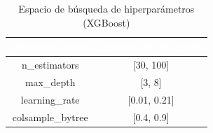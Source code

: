 \begin{table}[htp]
	\centering
	\renewcommand{\arraystretch}{1.3}
		\begin{tabular}{ | c | c | }
			\hline
			\rowcolor[HTML]{5B9BD5} 
			\textcolor{white}{\textbf{Hiperparámetro}} & \textcolor{white}{\textbf{Espacio de búsqueda}}\\
			\hline
			
			n\_estimators & [30, 100] \\
			\hline
			max\_depth & [3, 8] \\
			\hline
			learning\_rate & [0.01, 0.21] \\
			\hline
			colsample\_bytree & [0.4, 0.9] \\
			\hline
			
		\end{tabular} 
		
		\caption{Espacio de búsqueda de hiperparámetros (XGBoost)}
		\label{table:xgb_hiperparam}
	\end{table}